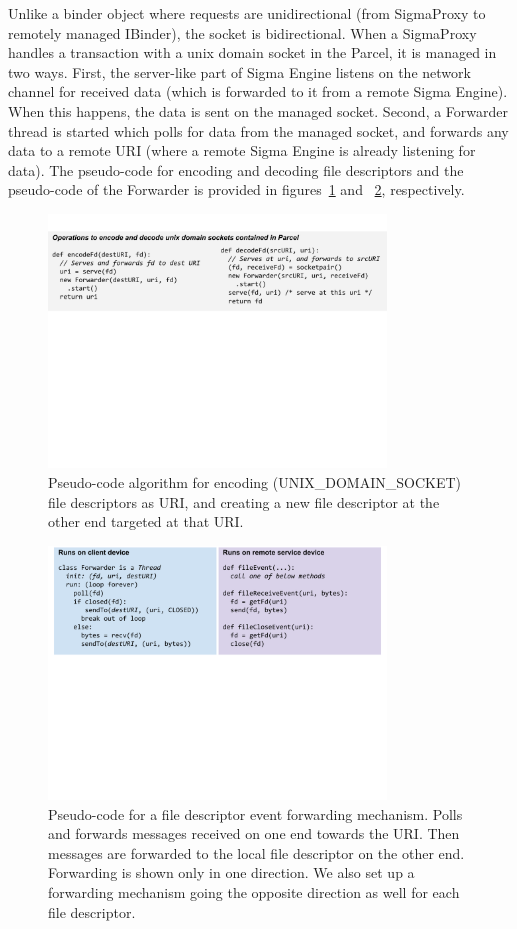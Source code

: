 \documentclass[prodmode]{acmlarge}
\begin{document}
Unlike a binder object where requests are unidirectional (from SigmaProxy to remotely managed IBinder), the socket is bidirectional. When a SigmaProxy handles a transaction with a unix domain socket in the Parcel, it is managed in two ways. First, the server-like part of Sigma Engine listens on the network channel for received data (which is forwarded to it from a remote Sigma Engine). When this happens, the data is sent on the managed socket. Second, a Forwarder thread is started which polls for data from the managed socket, and forwards any data to a remote URI (where a remote Sigma Engine is already listening for data). The pseudo-code for encoding and decoding file descriptors and the pseudo-code of the Forwarder is provided in figures~\ref{fig:encodeFds} and ~\ref{fig:fdForwarder}, respectively.

\begin{figure}[h]
\centering
\includegraphics[width=0.8\textwidth]{drawings/encodeFds.pdf}
\caption{Pseudo-code algorithm for encoding (UNIX\_DOMAIN\_SOCKET) file descriptors as URI, and creating a new file descriptor at the other end targeted at that URI.}
\label{fig:encodeFds}
\end{figure}

\begin{figure}[h]
\centering
\includegraphics[width=0.8\textwidth]{drawings/forwardFds.pdf}
\caption{Pseudo-code for a file descriptor event forwarding mechanism. Polls and forwards messages received on one end towards the URI. Then messages are forwarded to the local file descriptor on the other end. Forwarding is shown only in one direction. We also set up a forwarding mechanism going the opposite direction as well for each file descriptor.}
\label{fig:fdForwarder}
\end{figure}
\end{document}
